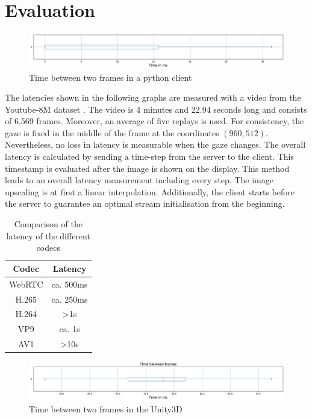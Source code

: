 
\chapter{Evaluation}\label{chapter:evaluation}
\begin{figure}[htbp]
    \includegraphics[width=\textwidth,height=\textheight,keepaspectratio]{logos/PurePythonLatencies.png}
     \caption{Time between two frames in a python client}
    \label{fig:PythonFPS}
\end{figure}
The latencies shown in the following graphs are measured with a video from the
Youtube-8M dataset \parencite{abuelhaija2016}. The video is 4 minutes and 22.94 seconds long and consists of 6,569 frames. Moreover, an average of five replays is used. For consistency, the gaze is fixed in the middle of the frame at the coordinates \((960,512)\). Nevertheless, no loss in latency is measurable when the gaze changes. The overall latency is calculated by sending a time-step from the server to the client. This timestamp is evaluated after the image is shown on the display. This method leads to an overall latency measurement including every step. The image upscaling is at first a linear interpolation. Additionally, the client starts before the server to guarantee an optimal stream initialisation from the beginning.

\begin{table}
\centering
\begin{tabular}{ c | c }
\hline
 Codec & Latency \\ [0.5ex] 
\hline\hline
 WebRTC & ca. 500ms \\ 
 H.265  & ca. 250ms \\  
 H.264  &   >1s     \\  
 VP9    & ca. 1s    \\
 AV1    &   >10s    \\  
\end{tabular}
\caption{Comparison of the latency of the different codecs}
\label{table:comparisoncodecs}
\end{table}


\begin{figure}[htbp]
    \includegraphics[width=\textwidth,height=\textheight,keepaspectratio]{logos/Unity3DFPS.png}
    \caption{Time between two frames in the Unity3D}
    \label{fig:UnityFPS}
\end{figure}

